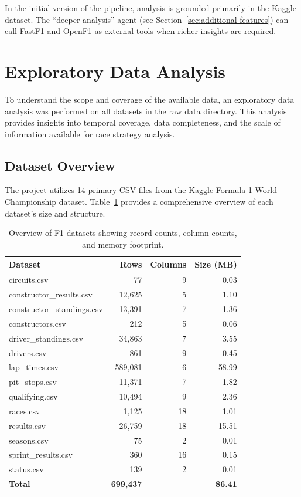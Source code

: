 \documentclass[11pt]{article}
\begin{document}
In the initial version of the pipeline, analysis is grounded primarily in the Kaggle dataset. The ``deeper analysis'' agent (see Section~\ref{sec:additional-features}) can call FastF1 and OpenF1 as external tools when richer insights are required.

\section{Exploratory Data Analysis}

To understand the scope and coverage of the available data, an exploratory data analysis was performed on all datasets in the raw data directory. This analysis provides insights into temporal coverage, data completeness, and the scale of information available for race strategy analysis.

\subsection{Dataset Overview}

The project utilizes 14 primary CSV files from the Kaggle Formula 1 World Championship dataset. Table~\ref{tab:datasets} provides a comprehensive overview of each dataset's size and structure.

\begin{table}[h!]
\centering
\small
\begin{tabular}{lrrr}
\hline
\textbf{Dataset} & \textbf{Rows} & \textbf{Columns} & \textbf{Size (MB)} \\
\hline
circuits.csv & 77 & 9 & 0.03 \\
constructor\_results.csv & 12,625 & 5 & 1.10 \\
constructor\_standings.csv & 13,391 & 7 & 1.36 \\
constructors.csv & 212 & 5 & 0.06 \\
driver\_standings.csv & 34,863 & 7 & 3.55 \\
drivers.csv & 861 & 9 & 0.45 \\
lap\_times.csv & 589,081 & 6 & 58.99 \\
pit\_stops.csv & 11,371 & 7 & 1.82 \\
qualifying.csv & 10,494 & 9 & 2.36 \\
races.csv & 1,125 & 18 & 1.01 \\
results.csv & 26,759 & 18 & 15.51 \\
seasons.csv & 75 & 2 & 0.01 \\
sprint\_results.csv & 360 & 16 & 0.15 \\
status.csv & 139 & 2 & 0.01 \\
\hline
\textbf{Total} & \textbf{699,437} & -- & \textbf{86.41} \\
\hline
\end{tabular}
\caption{Overview of F1 datasets showing record counts, column counts, and memory footprint.}
\label{tab:datasets}
\end{table}
\end{document}
